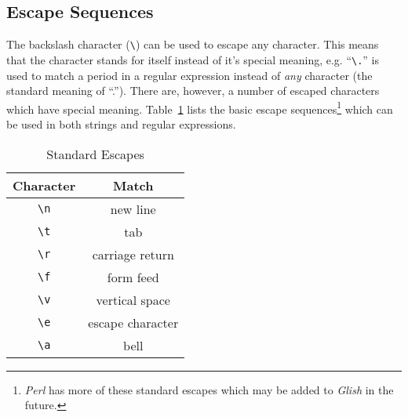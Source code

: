 \subsection{Escape Sequences}
\label{regex-escapes}
The backslash character (\verb+\+) can be used to escape any character. This
means that the character stands for itself instead of it's special meaning,
e.g. ``\verb+\.+'' is used to match a period in a regular expression instead
of {\em any} character (the standard meaning of ``.''). There are, however, a
number of escaped characters which have special meaning. Table~\ref{escape-std}
lists the basic escape sequences\footnote{{\em Perl} has more of these standard
escapes which may be added to {\em Glish} in the future.}
which can be used in both strings and regular expressions.
\begin{table}[tbh]
\begin{center}
\begin{tabular}{|c|c|}
\hline
Character & Match \\
\hline
\hline
\verb-\n-    & new line \\ \hline
\verb-\t-    & tab \\ \hline
\verb-\r-    & carriage return \\ \hline
\verb-\f-    & form feed \\ \hline
\verb-\v-    & vertical space \\ \hline
\verb-\e-    & escape character \\ \hline
\verb-\a-    & bell \\ \hline
\end{tabular}
\end{center}

\caption{ Standard Escapes }
\label{escape-std}
\end{table}

